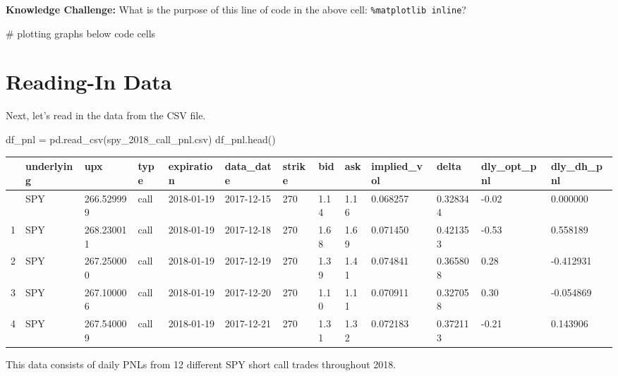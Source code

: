 \documentclass[
  letterpaper,
  DIV=11,
  numbers=noendperiod]{scrreprt}
\newenvironment{Shaded}{\begin{snugshade}}{\end{snugshade}}
\newcommand{\CommentTok}[1]{\textcolor[rgb]{0.37,0.37,0.37}{#1}}
\newcommand{\NormalTok}[1]{\textcolor[rgb]{0.00,0.23,0.31}{#1}}
\newcommand{\OperatorTok}[1]{\textcolor[rgb]{0.37,0.37,0.37}{#1}}
\newcommand{\StringTok}[1]{\textcolor[rgb]{0.13,0.47,0.30}{#1}}
\begin{document}
\textbf{Knowledge Challenge:} What is the purpose of this line of code
in the above cell: \texttt{\%matplotlib\ inline}?

\begin{Shaded}
\begin{Highlighting}[]
\CommentTok{\# plotting graphs below code cells}
\end{Highlighting}
\end{Shaded}

\hypertarget{reading-in-data-8}{%
\section{Reading-In Data}\label{reading-in-data-8}}

Next, let's read in the data from the CSV file.

\begin{Shaded}
\begin{Highlighting}[]
\NormalTok{df\_pnl }\OperatorTok{=}\NormalTok{ pd.read\_csv(}\StringTok{\textquotesingle{}spy\_2018\_call\_pnl.csv\textquotesingle{}}\NormalTok{)}
\NormalTok{df\_pnl.head()}
\end{Highlighting}
\end{Shaded}

\begin{longtable}[]{@{}lllllllllllll@{}}
\toprule\noalign{}
& underlying & upx & type & expiration & data\_date & strike & bid & ask
& implied\_vol & delta & dly\_opt\_pnl & dly\_dh\_pnl \\
\midrule\noalign{}
\endhead
\bottomrule\noalign{}
\endlastfoot
0 & SPY & 266.529999 & call & 2018-01-19 & 2017-12-15 & 270 & 1.14 &
1.16 & 0.068257 & 0.328344 & -0.02 & 0.000000 \\
1 & SPY & 268.230011 & call & 2018-01-19 & 2017-12-18 & 270 & 1.68 &
1.69 & 0.071450 & 0.421353 & -0.53 & 0.558189 \\
2 & SPY & 267.250000 & call & 2018-01-19 & 2017-12-19 & 270 & 1.39 &
1.41 & 0.074841 & 0.365808 & 0.28 & -0.412931 \\
3 & SPY & 267.100006 & call & 2018-01-19 & 2017-12-20 & 270 & 1.10 &
1.11 & 0.070911 & 0.327058 & 0.30 & -0.054869 \\
4 & SPY & 267.540009 & call & 2018-01-19 & 2017-12-21 & 270 & 1.31 &
1.32 & 0.072183 & 0.372113 & -0.21 & 0.143906 \\
\end{longtable}

This data consists of daily PNLs from 12 different SPY short call trades
throughout 2018.
\end{document}
